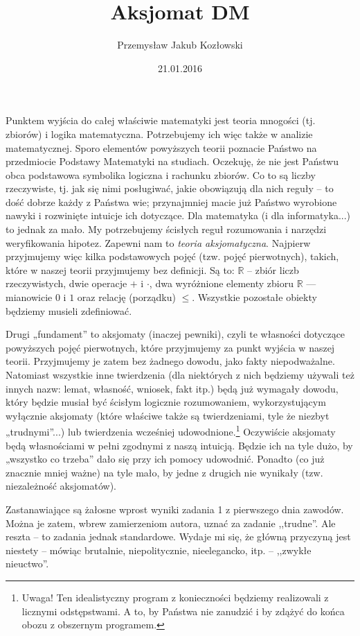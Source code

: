 \documentclass[zad,zawodnik,utf8]{sinol}
\title{Aksjomat DM}
\author{Przemysław Jakub Kozłowski} %
\date{21.01.2016}
\begin{document}
\begin{tasktext}%
Punktem wyjścia do całej właściwie matematyki jest teoria mnogości (tj. zbiorów) i logika matematyczna. Potrzebujemy ich więc także w analizie matematycznej. Sporo elementów powyższych teorii poznacie Państwo na przedmiocie Podstawy Matematyki na studiach. Oczekuję, że nie jest Państwu obca podstawowa symbolika logiczna i rachunku zbiorów. Co to są liczby rzeczywiste, tj. jak się nimi posługiwać, jakie obowiązują dla nich reguły -- to dość dobrze każdy z Państwa wie; przynajmniej macie już Państwo wyrobione nawyki i rozwinięte intuicje ich dotyczące. Dla matematyka (i dla informatyka...) to jednak za mało. My potrzebujemy ścisłych reguł rozumowania i narzędzi weryfikowania hipotez.  Zapewni nam to \textit{teoria aksjomatyczna}. Najpierw przyjmujemy więc kilka podstawowych pojęć (tzw. pojęć pierwotnych), takich, które w naszej teorii przyjmujemy bez definicji. Są to: $\mathbb{R}$ -- zbiór liczb rzeczywistych, dwie operacje $+$ i $\cdot$, dwa wyróżnione elementy zbioru $\mathbb{R}$ — mianowicie $0$ i $1$ oraz relację (porządku) $\leq$. Wszystkie pozostałe obiekty będziemy musieli zdefiniować.

Drugi „fundament” to aksjomaty (inaczej pewniki), czyli te własności dotyczące powyższych pojęć pierwotnych, które przyjmujemy za punkt wyjścia w naszej teorii. Przyjmujemy je zatem bez żadnego dowodu, jako fakty niepodważalne. Natomiast wszystkie inne twierdzenia (dla niektórych z nich będziemy używali też innych nazw: lemat, własność, wniosek, fakt itp.) będą już wymagały dowodu, który będzie musiał być ścisłym logicznie rozumowaniem, wykorzystującym wyłącznie aksjomaty (które właściwe także są twierdzeniami, tyle że niezbyt „trudnymi”...) lub twierdzenia wcześniej udowodnione.\footnote{ Uwaga! Ten idealistyczny program z konieczności będziemy realizowali z licznymi odstępstwami. A to, by Państwa nie zanudzić i by zdążyć do końca obozu z obszernym programem.}
Oczywiście aksjomaty będą własnościami w pełni zgodnymi z naszą intuicją. Będzie ich na tyle dużo, by „wszystko co trzeba” dało się przy ich pomocy udowodnić. Ponadto (co już znacznie mniej ważne) na tyle mało, by jedne z drugich nie wynikały (tzw. niezależność aksjomatów).

Zastanawiające są żałosne wprost wyniki zadania 1 z pierwszego dnia zawodów. Można je zatem, wbrew zamierzeniom autora, uznać za zadanie ,,trudne''. Ale reszta -- to zadania jednak standardowe. Wydaje mi się, że główną przyczyną jest niestety -- mówiąc brutalnie, niepolitycznie, nieelegancko, itp. -- ,,zwykłe nieuctwo''.


\end{tasktext}
\end{document}
